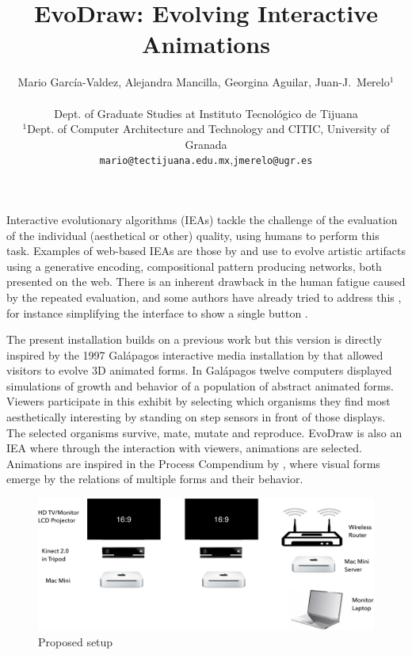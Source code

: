 \documentclass[letterpaper]{article}
\title{EvoDraw: Evolving Interactive Animations}
\author{ Mario Garc\'ia-Valdez, Alejandra Mancilla, Georgina Aguilar, Juan-J.~Merelo$^1$\\
\mbox{}\\
Dept. of Graduate Studies at Instituto Tecnol\'ogico de Tijuana \\
$^1$Dept. of Computer Architecture and Technology and CITIC, 
University of Granada \\
{\tt mario@tectijuana.edu.mx},{\tt jmerelo@ugr.es}}
\begin{document}
\maketitle


Interactive evolutionary algorithms (IEAs) tackle the challenge of
the evaluation of the individual (aesthetical or other) quality, using
humans to perform this task. Examples of web-based IEAs are
those by \cite{picbreeder} and \cite{forms}
use  to evolve artistic artifacts using a generative encoding, compositional
pattern producing networks, both presented on the web.
There is an inherent drawback in the human fatigue caused by the repeated evaluation, and some authors have
already tried to address this \citep{Frade:2010:EvoGAMES}, for instance simplifying the interface to show a single button \citep{davies2016evolving}. %


The present installation builds on a previous work \citep{garcia2013evospace}
but this version is directly inspired by the 1997 Galápagos interactive 
media installation by \cite{galapagos} that allowed visitors to evolve 3D animated forms. 
In Gal{\'a}pagos twelve computers displayed simulations of growth and 
behavior of a population of abstract animated forms. Viewers
participate in this exhibit by selecting which organisms they find
most aesthetically interesting by standing on step sensors in front 
of those displays. The selected organisms survive, mate, mutate and 
reproduce. EvoDraw is also an IEA where through the interaction
with viewers, animations are selected. Animations are inspired in 
the Process Compendium by \cite{reas:2004}, where visual forms 
emerge by the relations of multiple forms and their behavior. 

\label{Description}
\begin{figure}[!t]
\centering
\includegraphics[width=6in]{EvoDrawTech.pdf}
\caption{Proposed setup}
\label{fig:system}
\end{figure}
\end{document}
